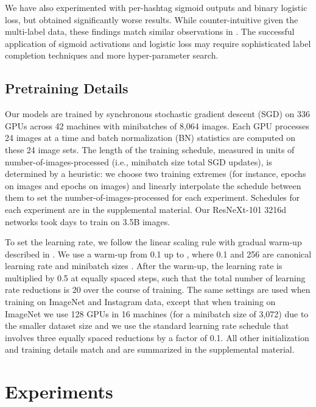 \documentclass[runningheads]{llncs}
\makeatletter
\newcommand{\ie}{i.e.\@\xspace}
\makeatother
\begin{document}
We have also experimented with per-hashtag sigmoid outputs and binary logistic loss, but obtained significantly worse results. While counter-intuitive given the multi-label data, these findings match similar observations in \cite{joulin2016learning}. The successful application of sigmoid activations and logistic loss may require sophisticated label completion techniques \cite{sun2017unreasonable} and more hyper-parameter search.

\subsection{Pretraining Details}

Our models are trained by synchronous stochastic gradient descent (SGD) on 336 GPUs across 42 machines with minibatches of 8,064 images. Each GPU processes 24 images at a time and batch normalization (BN) \cite{Ioffe2015} statistics are computed on these 24 image sets. The length of the training schedule, measured in units of number-of-images-processed (\ie, minibatch size  total SGD updates), is determined by a heuristic: we choose two training extremes (for instance,  epochs on  images and  epochs on  images) and linearly interpolate the schedule between them to set the number-of-images-processed for each experiment. Schedules for each experiment are in the supplemental material. Our ResNeXt-101 3216d networks took  days to train on 3.5B images.

To set the learning rate, we follow the linear scaling rule with gradual warm-up described in \cite{goyal2017accurate}. We use a warm-up from 0.1 up to , where 0.1 and 256 are canonical learning rate and minibatch sizes \cite{He2015}. After the warm-up, the learning rate is multiplied by 0.5 at equally spaced steps, such that the total number of learning rate reductions is 20 over the course of training. The same settings are used when training on ImageNet and Instagram data, except that when training on ImageNet we use 128 GPUs in 16 machines (for a minibatch size of 3,072) due to the smaller dataset size and we use the standard learning rate schedule that involves three equally spaced reductions by a factor of 0.1. All other initialization and training details match \cite{goyal2017accurate} and are summarized in the supplemental material.
 \section{Experiments}
\label{sec:experiments}
\end{document}
